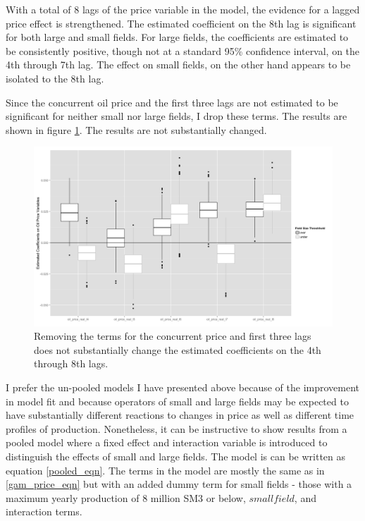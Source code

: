 \documentclass[12pt]{article}
\begin{document}
With a total of 8 lags of the price variable in the model, the evidence for a lagged price effect is strengthened.  The estimated coefficient on the 8th lag is significant for both large and small fields.  For large fields, the coefficients are estimated to be consistently positive, though not at a standard 95\% confidence interval, on the 4th through 7th lag.  The effect on small fields, on the other hand appears to be isolated to the 8th lag. 

Since the concurrent oil price and the first three lags are not estimated to be significant for neither small nor large fields, I drop these terms.  The results are shown in figure \ref{gam_price_short}.  The results are not substantially changed.  

\begin{figure}
	\includegraphics[width=1\textwidth]{figures/gam_price_short_print.png}
	\caption{Removing the terms for the concurrent price and first three lags does not substantially change the estimated coefficients on the 4th through 8th lags.}
	\label{gam_price_short}
\end{figure}

I prefer the un-pooled models I have presented above because of the improvement in model fit and because operators of small and large fields may be expected to have substantially different reactions to changes in price as well as different time profiles of production. Nonetheless, it can be instructive to show results from a pooled model where a fixed effect and interaction variable is introduced to distinguish the effects of small and large fields. The model is can be written as equation \ref{pooled_eqn}.  The terms in the model are mostly the same as in \ref{gam_price_eqn} but with an added dummy term for small fields - those with a maximum yearly production of 8 million SM3 or below, $smallfield$, and interaction terms.  
\end{document}
